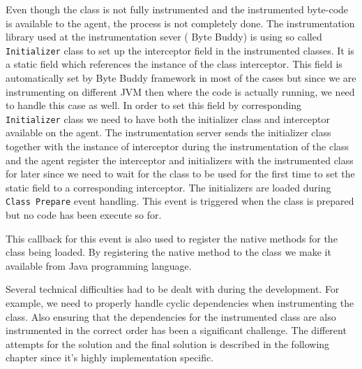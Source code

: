 Even though the class is not fully instrumented and the instrumented byte-code is available to the agent, the process is not completely done. The instrumentation library used at the instrumentation sever ( Byte Buddy) is using so called \texttt{Initializer} class to set up the interceptor field in the instrumented classes. It is a static field which references the instance of the class interceptor. This field is automatically set by Byte Buddy framework in most of the cases but since we are instrumenting on different JVM then where the code is actually running, we need to handle this case as well. In order to set this field by corresponding \texttt{Initializer} class we need to have both the initializer class and interceptor available on the agent. The instrumentation server sends the initializer class together with the instance of interceptor during the instrumentation of the class and the agent register the interceptor and initializers with the instrumented class for later since we need to wait for the class to be used for the first time to set the static field to a corresponding interceptor. The initializers are loaded during  \texttt{Class Prepare} event handling. This event is triggered when the class is prepared but no code has been execute so for. 

This callback for this event is also used to register the native methods for the class being loaded. By registering the native method to the class we make it available from Java programming language.

Several technical difficulties had to be dealt with during the development. For example, we need to properly handle cyclic dependencies when instrumenting the class. Also ensuring that the dependencies for the instrumented class are also instrumented in the correct order has been a significant challenge. The different attempts for the solution and the final solution is described in the following chapter since it's highly implementation specific.
